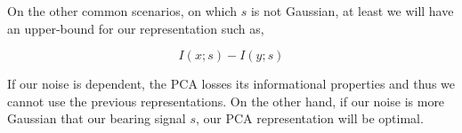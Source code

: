 On the other common scenarios, on which $s$ is not Gaussian, at least we will have an upper-bound for our representation such as,

\begin{equation}
\label{eq:pca_upper_bound}
I(x;s) - I(y;s)
\end{equation}

If our noise is dependent, the PCA losses its informational properties and thus we cannot use the previous representations. On the other hand, if our noise is more Gaussian that our bearing signal $s$, our PCA representation will be optimal.